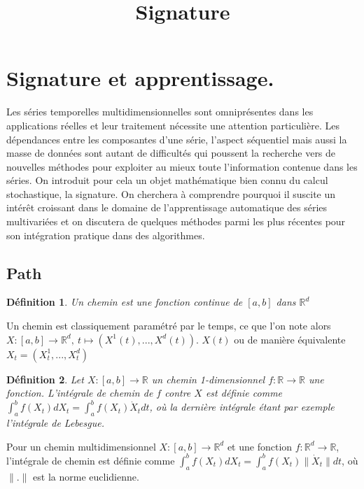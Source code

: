 \documentclass[10pt,a4paper]{article}
\newtheorem{definition}{Définition}
\begin{document}
\title{Signature}
\date{}
\maketitle


\newtheorem{proposition}{Proposition}
\newtheorem{lemma}{Lemma}
\newtheorem{theorem}{Theorem}
\newtheorem{corollary}{Corollary}
\newtheorem{example}{Example}

\newcommand{\R}{\mathbb{R}}
\newcommand{\C}{\mathbb{C}}
\newcommand{\N}{\mathbb{N}}
\newcommand{\Ll}{\mathbb{Ll}}

\vspace{10 mm}




\maketitle


\section{Signature et apprentissage.}

Les séries temporelles multidimensionnelles sont omniprésentes dans les applications réelles et leur traitement nécessite une attention particulière. Les dépendances entre les composantes d'une série, l'aspect séquentiel mais aussi la masse de données sont autant de difficultés qui poussent la recherche vers de nouvelles méthodes pour exploiter au mieux toute l'information contenue dans les séries. On introduit pour cela un objet mathématique bien connu du calcul stochastique, la signature. On cherchera à comprendre pourquoi il suscite un intérêt croissant dans le domaine de l'apprentissage automatique des séries multivariées et on discutera de quelques méthodes parmi les plus récentes pour son intégration pratique dans des algorithmes.

\subsection{Path}
\smallskip
\begin{definition}
Un chemin est une fonction continue de $[a, b]$ dans $\R^d$
\end{definition}
Un chemin est classiquement paramétré par le temps, ce que l'on note alors $X : [a, b] \rightarrow \R^d, \: t \mapsto \left(X^1(t), ..., X^d(t)\right)$. $X(t)$ ou de manière équivalente $X_t = (X_t^1, ..., X_t^d)$

\smallskip
\begin{definition}
Let $X : [a, b] \rightarrow \R$ un chemin 1-dimensionnel $f : \R \rightarrow \R$ une fonction. L'intégrale de chemin de $f$ contre $X$ est définie comme $\int_a^b f(X_t)dX_t = \int_a^b f(X_t) \dot X_t dt$, où la dernière intégrale étant par exemple l'intégrale de Lebesgue.
\end{definition}
Pour un chemin multidimensionnel $X : [a, b] \rightarrow \R^d$ et une fonction $f : \R^d \rightarrow \R$, l'intégrale de chemin est définie comme $\int_a^b f(X_t) dX_t = \int_a^b f(X_t) \| \dot X_t\| dt$, où $\|.\|$ est la norme euclidienne. \\
\end{document}
